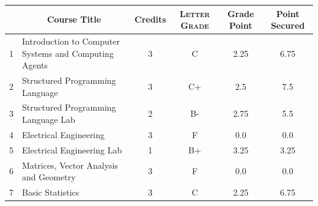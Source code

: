 \documentclass[11pt]{article}
\newcommand*{\numtwo}[1]{\pgfmathprintnumber[
                    fixed, precision=2, fixed zerofill=true]{#1}}
\begin{document}
                \begin{center}
                    \renewcommand{\arraystretch}{1.08}
                    
                \begin{tabular}{|c|l|c|>{\scshape}c|c|c|}
                \hline  \rule[-1ex]{0pt}{3.5ex} {\centering{\bf Course Code}} &  \multicolumn{1}{c|}{\textbf{Course Title}}  & {\bf Credits} & {\bf Letter Grade} & {\bf Grade Point} & {\bf Point Secured}  \\ 
                \hline   1 &  Introduction to Computer Systems and Computing Agents		 & 3 & C & 2.25 & 6.75 \\ %
                \hline   2 &  Structured Programming Language		 & 3 & C+ & 2.5 & 7.5 \\ %
                \hline   3 &  Structured Programming Language Lab		 & 2 & B- & 2.75 & 5.5 \\ %
                \hline   4 &  Electrical Engineering		 & 3 & F & 0.0 & 0.0 \\ %
                \hline   5 &  Electrical Engineering Lab		 & 1 & B+ & 3.25 & 3.25 \\ %
                \hline   6 &  Matrices, Vector Analysis and Geometry		 & 3 & F & 0.0 & 0.0 \\ %
                \hline   7 &  Basic Statistics		 & 3 & C & 2.25 & 6.75 \\ %

\hline                %
                \end{tabular}
                \end{center}
                \renewcommand{\arraystretch}{1.03}
\end{document}
